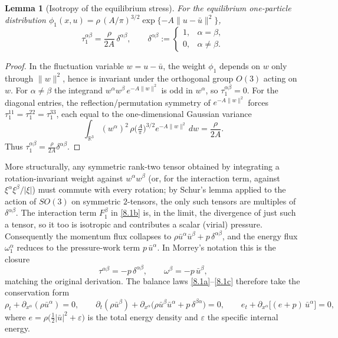 \documentclass[11pt]{article}
\newtheorem{lemma}{Lemma}
\begin{document}
\begin{lemma}[Isotropy of the equilibrium stress]\label{lem:isotropy}
For the equilibrium one-particle distribution $\phi_1(x,u)=\rho\,(A/\pi)^{3/2}\exp\{-A\|u-\bar u\|^2\}$,
\[
\tau_1^{\alpha\beta}=\frac{\rho}{2A}\,\delta^{\alpha\beta},
\qquad
\delta^{\alpha\beta}:=\begin{cases}1,&\alpha=\beta,\\[2pt] 0,&\alpha\neq\beta.\end{cases}
\]
\end{lemma}

\begin{proof}
In the fluctuation variable $w=u-\bar u$, the weight $\phi_1$ depends on $w$ only through $\|w\|^2$, hence is invariant under the orthogonal group $O(3)$ acting on $w$. For $\alpha\neq\beta$ the integrand $w^\alpha w^\beta\,e^{-A\|w\|^2}$ is odd in $w^\alpha$, so $\tau_1^{\alpha\beta}=0$. For the diagonal entries, the reflection/permutation symmetry of $e^{-A\|w\|^2}$ forces $\tau_1^{11}=\tau_1^{22}=\tau_1^{33}$, each equal to the one-dimensional Gaussian variance
\[
\int_{\mathbb R^3}(w^\alpha)^2\,\rho\Big(\tfrac{A}{\pi}\Big)^{3/2}e^{-A\|w\|^2}\,dw=\frac{\rho}{2A}.
\]
Thus $\tau_1^{\alpha\beta}=\frac{\rho}{2A}\delta^{\alpha\beta}$.
\end{proof}

\noindent
More structurally, any symmetric rank-two tensor obtained by integrating a rotation-invariant weight against $w^\alpha w^\beta$ (or, for the interaction term, against $\xi^\alpha\xi^\beta/|\xi|$) must commute with every rotation; by Schur's lemma applied to the action of $SO(3)$ on symmetric $2$-tensors, the only such tensors are multiples of $\delta^{\alpha\beta}$. The interaction term $F_1^\beta$ in \eqref{8.1b} is, in the limit, the divergence of just such a tensor, so it too is isotropic and contributes a scalar (virial) pressure. Consequently the momentum flux collapses to $\rho\bar u^\alpha\bar u^\beta+p\,\delta^{\alpha\beta}$, and the energy flux $\omega_1^\alpha$ reduces to the pressure-work term $p\,\bar u^\alpha$. In Morrey's notation this is the closure
\[
\tau^{\alpha\beta}=-p\,\delta^{\alpha\beta},\qquad \omega^\beta=-p\,\bar u^\beta,
\]
matching the original derivation. The balance laws \eqref{8.1a}--\eqref{8.1c} therefore take the conservation form
\begin{equation}\label{euler-cons}\tag{8.2}
\rho_t + \partial_{x^\alpha}(\rho \bar u^\alpha)=0,
\qquad
\partial_t(\rho \bar u^\beta) + \partial_{x^\alpha}\!\big(\rho \bar u^\beta \bar u^\alpha + p\,\delta^{\beta\alpha}\big)=0,
\qquad
e_t + \partial_{x^\alpha}\!\big[(e+p)\,\bar u^\alpha\big]=0,
\end{equation}
where $e=\rho\big(\tfrac12|\bar u|^2+\varepsilon\big)$ is the total energy density and $\varepsilon$ the specific internal energy.
\end{document}
